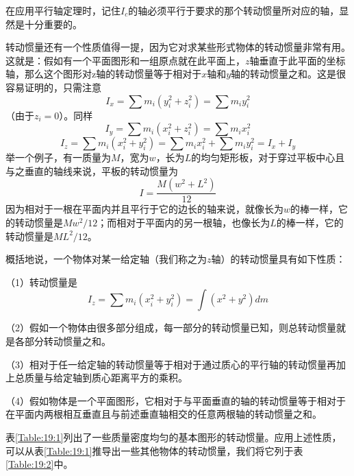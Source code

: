 在应用平行轴定理时，记住$I_c$的轴必须平行于要求的那个转动惯量所对应的轴，显然是十分重要的。

转动惯量还有一个性质值得一提，因为它对求某些形式物体的转动惯量非常有用。这就是：假如有一个平面图形和一组原点就在此平面上，$z$轴垂直于此平面的坐标轴，那么这个图形对z轴的转动惯量等于相对于$x$轴和$y$轴的转动惯量之和。这是很容易证明的，只需注意
\begin{equation*}
    I_x = \sum m_i(y_i^2 + z_i^2) = \sum m_iy_i^2
\end{equation*}
（由于$z_i=0$）。同样
\begin{equation*}
    I_y = \sum m_i(x_i^2 + z_i^2) = \sum m_ix_i^2
\end{equation*}
\begin{equation*}
    I_z = \sum m_i(x_i^2 + y_i^2) = \sum m_ix_i^2 + \sum m_iy_i^2 = I_x + I_y
\end{equation*}
举一个例子，有一质量为$M$，宽为$w$，长为$L$的均匀矩形板，对于穿过平板中心且与之垂直的轴线来说，平板的转动惯量为
\begin{equation*}
    I = \frac{M(w^2+L^2)}{12}
\end{equation*}
因为相对于一根在平面内并且平行于它的边长的轴来说，就像长为$w$的棒一样，它的转动惯量是$Mw^2/12$；而相对于平面内的另一根轴，也像长为$L$的棒一样，它的转动惯量是$ML^2/12$。

概括地说，一个物体对某一给定轴（我们称之为$z$轴）的转动惯量具有如下性质：

（1）转动惯量是
\begin{equation*}
    I_z = \sum m_i(x_i^2 + y_i^2) = \int (x^2+y^2)dm
\end{equation*}

（2）假如一个物体由很多部分组成，每一部分的转动惯量已知，则总转动惯量就是各部分转动惯量之和。

（3）相对于任一给定轴的转动惯量等于相对于通过质心的平行轴的转动惯量再加上总质量与给定轴到质心距离平方的乘积。

（4）假如物体是一个平面图形，它相对于与平面垂直的轴的转动惯量等于相对于在平面内两根相互垂直且与前述垂直轴相交的任意两根轴的转动惯量之和。

表\ref{Table:19:1}列出了一些质量密度均匀的基本图形的转动惯量。应用上述性质，可以从表\ref{Table:19:1}推导出一些其他物体的转动惯量，我们将它列于表\ref{Table:19:2}中。

\begin{table}[H]
    \footnotesize
    \centering
    \caption{}
    \label{Table:19:1}
\end{table}

